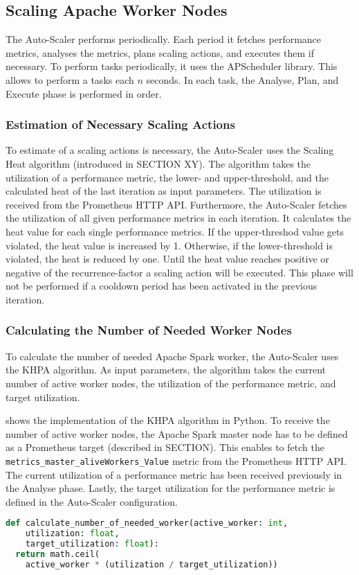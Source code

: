 \subsection{Scaling Apache Worker Nodes}
The Auto-Scaler performs periodically. Each period it fetches performance metrics, analyses the metrics, plans scaling actions, and executes them if necessary.
To perform tasks periodically, it uses the APScheduler library. This allows to perform a tasks each $n$ seconds.
In each task, the Analyse, Plan, and Execute phase is performed in order.


\subsubsection{Estimation of Necessary Scaling Actions}
To estimate of a scaling actions is necessary, the Auto-Scaler uses the Scaling Heat algorithm (introduced in SECTION XY).
The algorithm takes the utilization of a performance metric, the lower- and upper-threshold, and the calculated heat of the last iteration as input parameters.
The utilization is received from the Prometheus HTTP API. Furthermore, the Auto-Scaler fetches the utilization of all given performance metrics in each iteration. It calculates the heat value for each single performance metrics. If the upper-threshod value gets violated, the heat value is increased by 1. Otherwise, if the lower-threshold is violated, the heat is reduced by one.
Until the heat value reaches positive or negative of the recurrence-factor a scaling action will be executed.
This phase will not be performed if a cooldown period has been activated in the previous iteration.


\subsubsection{Calculating the Number of Needed Worker Nodes}
To calculate the number of needed Apache Spark worker, the Auto-Scaler uses the KHPA algorithm.
As input parameters, the algorithm takes the current number of active worker nodes, the utilization of the performance metric, and target utilization.

 shows the implementation of the KHPA algorithm in Python.
To receive the number of active worker nodes, the Apache Spark master node has to be defined as a Prometheus target (described in SECTION). This enables to fetch the \texttt{metrics\_master\_aliveWorkers\_Value} metric from the Prometheus HTTP API. The current utilization of a performance metric has been received previously in the Analyse phase. Lastly, the target utilization for the performance metric is defined in the Auto-Scaler configuration. 
\begin{lstlisting}[label=lst:06_auto-scaler_plan_khpa, caption=KHPA implementation using Python 3.8, language=Python]
def calculate_number_of_needed_worker(active_worker: int,
    utilization: float,
    target_utilization: float):
  return math.ceil(
    active_worker * (utilization / target_utilization))
\end{lstlisting}


